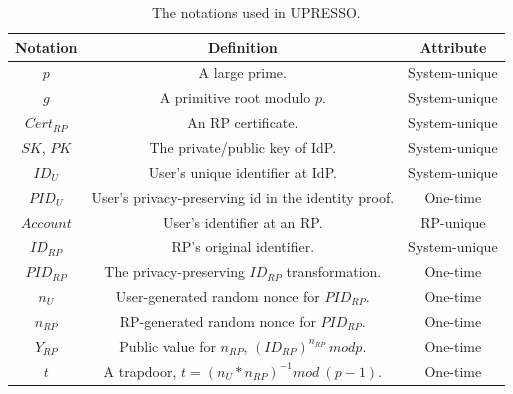 \begin{table}[tb]
    \caption{The notations used in UPRESSO.}
    \centering
    \begin{tabular}{|c|c|c|}
    \hline
    {Notation} & {Definition} & {Attribute} \\
    \hline
    {$p$} & {A large prime.} & {System-unique} \\
    \hline
    {$g$} & {A primitive root  modulo $p$. } & {System-unique} \\
    \hline
    {$Cert_{RP}$} & {An RP certificate. } & {System-unique} \\
    \hline
    {$SK$, $PK$} & {The private/public key of IdP. } & {System-unique} \\
    \hline
    {$ID_U$} & {User's unique identifier at IdP.} & {System-unique} \\
    \hline
    {$PID_U$} & {User's privacy-preserving id in the identity proof.} & {One-time}\\
    \hline
    {$Account$} & {User's identifier at an RP.} & {RP-unique} \\
    \hline
    {$ID_{RP}$} & {RP's original identifier.} & {System-unique} \\
    \hline
    {$PID_{RP}$} & {The privacy-preserving $ID_{RP}$ transformation.} & {One-time} \\
    \hline
    {$n_U$} & {User-generated random nonce for $PID_{RP}$.} & {One-time} \\
    \hline
    {$n_{RP}$} & {RP-generated random nonce for $PID_{RP}$.} & {One-time} \\
    \hline
    {$Y_{RP}$} & {Public value for $n_{RP}$, $(ID_{RP})^{n_{RP}} \ mod p$.} & {One-time} \\
    \hline
    {$t$} & {A trapdoor, $t=(n_U*n_{RP})^{-1} mod \ (p-1)$.} & {One-time} \\
    \hline
    \end{tabular}
    \label{tbl:notations}
\end{table}


